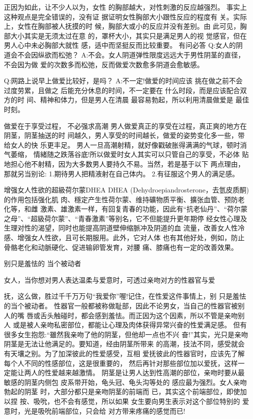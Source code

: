 \documentclass[12pt,UTF8]{ctexbook}
\begin{document}
正因为如此，让不少人以为，女性
的胸部越大，对性刺激的反应越强烈。
事实上这种观点是完全错误的，没有证
据证明女性胸部大小跟性反应的程度有
关。实际上，女性在胸部被人抚摸的时
候，胸部大或小的反应并没有差别。由
此可见，胸部大小其实是无须太过在意
的，罩杯大小，其实只是满足男人的视
觉感官，但在男人心中未必胸部大就性
感，适中而坚挺反而比较重要。
有问必答
Q:女人的阴道会不会因纵欲而松弛？
A:不会。女人阴道弹性限度远远大于男性阴茎的直径，不会因为做
爱的次数多而松弛，反而做爱次数愈多阴道会愈敏感。

Q:网路上说早上做爱比较好，是吗？
A:不一定!做爱的时间应该
挑在做之前不会过度劳累，且做之
后能充分休息的时间，不一定要在
什么时段，而是应该配合双方的时
间、精神和体力，但是男人在清晨
最容易勃起，所以利用清晨做爱是
最佳时刻。

做爱在于享受过程，
不必强求高潮
男人做爱真正的享受在过程，真正爽的地方在阴茎，阴茎抽送的时
间越久，男人享受的时间越长，做爱的姿势变化多一些，带给女人的快
乐更丰足。
男人一旦高潮射精，就好像戳破胀得满满的气球，顿时消气萎缩，
情緒随之跌落谷底!所以做爱时女人其实可以只管自己的享受，不必体
贴地担心他不射精，因为大多数男人要持久不易。当然，若是基于以下
两点理由，那就另当别论:
1.期待男人把精液射在自己体内。
2.有征服这个男人的满足感。

增强女人性欲的超級荷尔蒙DHEA
DHEA (Dehydroepiandrosterone，去氫皮质酮)的作用包括强化肌
肉、穩定产生性荷尔蒙、维持礦物质平衡、擴张血管、预防老化等，和雌
激素、雄激素一样，有回复青春的功能，因此有“抗老仙丹”、“荷尔蒙
之母”、“超級荷尔蒙”、“青春激素”等别名，它不但能提升更年期停
经女性心理及生理对性的渴望，同时也能提高阴道壁伸缩脈冲及阴道的血
流量，改善女人性冷感、增强女人性欲，且可长期服用。此外，它对人体
也有其他好处，例如，防止骨骼老化和动脈硬化、促进输卵管发育，对腰
痛、膝痛也有一定的改善效果。

别只是羞怯的
当个被动者

女人，当你想对男人表达温柔与爱意时，可透过亲吻对方的性器官与爱

抚，这么做，胜过千千万万句“我爱你”喔!记住，在性爱这件事情上，别
只是羞怯的当个被动者。
性器官一般都被称做耻部，因此不论男女，当自己的性器官被别人的嘴
唇或舌头触碰时，都会感到羞怯。而正因为这个因素，所以不管是亲吻别人
或是被人亲吻私密部位，都能让心理及肉体获得异常兴奋的性爱满足感。
但有很多女生抱怨:“雖然我亲吻了他的阴茎，但他却一点也不兴
奋!”其实，光只是亲吻阴茎是无法让他满足的。要知道，经由阴茎所带来
的高潮，技法不同，感受就会有天壤之别。为了加深彼此的性爱感受，互相
爱抚彼此的性器官时，应该先了解每个人不同的性感部位，这是很重要的，
然后再针对那些部位加以爱抚，这样一定能让两人的性爱越来越激情。
阴茎是让男人达到性高潮的部位，亲吻时要从最敏感的阴茎内侧包
皮系带开始，龟头冠、龟头沟等处的
感应最为强烈。女人亲吻勃起的阴茎
时，大部分都只是亲吻阴茎的前端而
已，其实这个前端部位，即使加以捏
按、吸吮，也不会有感觉，所以如果
女生要向男生表示对这个部位特别的
爱意时，光是吸吮前端部位，只会给
对方带来疼痛的感觉而已!
\end{document}
